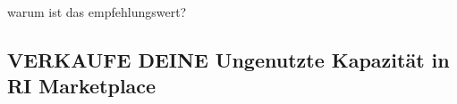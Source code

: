 

warum ist das empfehlungswert?

\subsection{VERKAUFE DEINE Ungenutzte Kapazität in RI Marketplace}



 